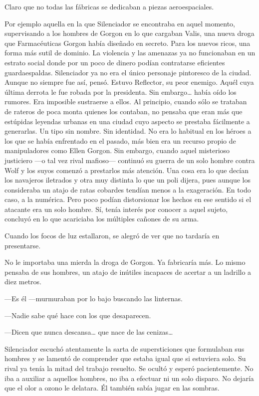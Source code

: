 Claro que no todas las fábricas se dedicaban a piezas aeroespaciales.

Por ejemplo aquella en la que Silenciador se encontraba en aquel momento, supervisando a los hombres de Gorgon en lo que cargaban Valis, una nueva droga que Farmacéuticas Gorgon había diseñado en secreto. Para los nuevos ricos, una forma más sutil de dominio. La violencia y las amenazas ya no funcionaban en un estrato social donde por un poco de dinero podían contratarse eficientes guardaespaldas. Silenciador ya no era el único personaje pintoresco de la ciudad. Aunque no siempre fue así, pensó. Estuvo Reflector, su peor enemigo. Aquél cuya última derrota le fue robada por la presidenta. Sin embargo\dots{} había oído los rumores. Era imposible sustraerse a ellos. Al principio, cuando sólo se trataban de rateros de poca monta quienes los contaban, no pensaba que eran más que estúpidas leyendas urbanas en una ciudad cuyo aspecto se prestaba fácilmente a generarlas. Un tipo sin nombre. Sin identidad. No era lo habitual en los héroes a los que se había enfrentado en el pasado, más bien era un recurso propio de manipuladores como Ellen Gorgon. Sin embargo, cuando aquel misterioso justiciero ---o tal vez rival mafioso--- continuó su guerra de un solo hombre contra Wolf y los suyos comenzó a prestarlos más atención. Una cosa era lo que decían los navajeros iletrados y otra muy distinta lo que un poli dijera, pues aunque los consideraba un atajo de ratas cobardes tendían menos a la exageración. En todo caso, a la numérica. Pero poco podían distorsionar los hechos en ese sentido si el atacante era un solo hombre. Sí, tenía interés por conocer a aquel sujeto, concluyó en lo que acariciaba los múltiples cañones de su arma.

Cuando los focos de luz estallaron, se alegró de ver que no tardaría en presentarse.

No le importaba una mierda la droga de Gorgon. Ya fabricaría más. Lo mismo pensaba de sus hombres, un atajo de inútiles incapaces de acertar a un ladrillo a diez metros.

---Es él ---murmuraban por lo bajo buscando las linternas.

---Nadie sabe qué hace con los que desaparecen.

---Dicen que nunca descansa\dots{} que nace de las cenizas\dots{}

Silenciador escuchó atentamente la sarta de supersticiones que formulaban sus hombres y se lamentó de comprender que estaba igual que si estuviera solo. Su rival ya tenía la mitad del trabajo resuelto. Se ocultó y esperó pacientemente. No iba a auxiliar a aquellos hombres, no iba a efectuar ni un solo disparo. No dejaría que el olor a ozono le delatara. Él también sabía jugar en las sombras.

